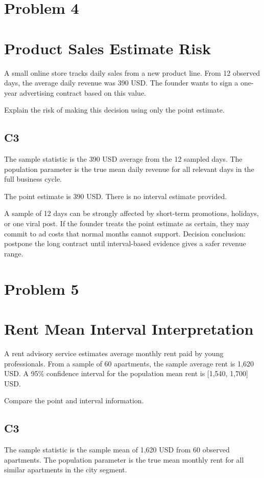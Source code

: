 \begin{ExamProblems}
		\newpage
		\item
		\section{Problem 4}
		\section{Product Sales Estimate Risk}
		A small online store tracks daily sales from a new product line.
		From 12 observed days, the average daily revenue was 390 USD.
		The founder wants to sign a one-year advertising contract based on this value.

		Explain the risk of making this decision using only the point estimate.

		\subsection*{C3}
		The sample statistic is the 390 USD average from the 12 sampled days.
		The population parameter is the true mean daily revenue for all relevant days in the full business cycle.

		The point estimate is 390 USD.
		There is no interval estimate provided.

		A sample of 12 days can be strongly affected by short-term promotions, holidays, or one viral post.
		If the founder treats the point estimate as certain, they may commit to ad costs that normal months cannot support.
		Decision conclusion: postpone the long contract until interval-based evidence gives a safer revenue range.

		\newpage
		\item
		\section{Problem 5}
		\section{Rent Mean Interval Interpretation}
		A rent advisory service estimates average monthly rent paid by young professionals.
		From a sample of 60 apartments, the sample average rent is 1,620 USD.
		A 95\% confidence interval for the population mean rent is [1,540, 1,700] USD.

		Compare the point and interval information.

		\subsection*{C3}
		The sample statistic is the sample mean of 1,620 USD from 60 observed apartments.
		The population parameter is the true mean monthly rent for all similar apartments in the city segment.


\end{ExamProblems}
